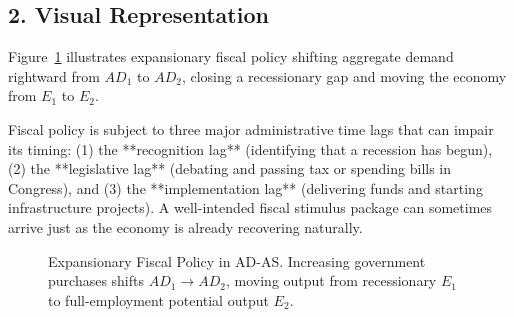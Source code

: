 \documentclass[11pt,letterpaper]{article}
\begin{document}
\subsection*{2. Visual Representation}
Figure~\ref{fig:fiscal_policy_adas} illustrates expansionary fiscal policy shifting aggregate demand rightward from $AD_1$ to $AD_2$, closing a recessionary gap and moving the economy from $E_1$ to $E_2$.

\begin{tcolorbox}[colback=yellow!10!white,colframe=orange!80!black,title=\textbf{Clear It Up: The Lags of Fiscal Policy}]
Fiscal policy is subject to three major administrative time lags that can impair its timing: (1) the **recognition lag** (identifying that a recession has begun), (2) the **legislative lag** (debating and passing tax or spending bills in Congress), and (3) the **implementation lag** (delivering funds and starting infrastructure projects). A well-intended fiscal stimulus package can sometimes arrive just as the economy is already recovering naturally.
\end{tcolorbox}

\begin{figure}[htbp]
\centering
{}
\caption{Expansionary Fiscal Policy in AD-AS. Increasing government purchases shifts $AD_1 \to AD_2$, moving output from recessionary $E_1$ to full-employment potential output $E_2$.}
\label{fig:fiscal_policy_adas}
\end{figure}
\end{document}

